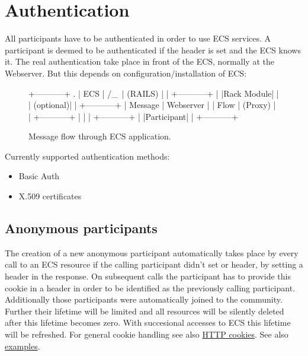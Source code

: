 \section{Authentication}%
%
All participants have to be authenticated in order to use ECS services. A
participant is deemed to be authenticated if the  header is set and
the ECS knows it. The real authentication take place in front of the ECS,
normally at the Webserver. But this depends on configuration/installation of
ECS:
\begin{figure}[p]
\noindent \begin{centering}
\begin{txtg}
   +-----------+    .        
   |   ECS     |   /_\       
   | (RAILS)   |    |        
   +-----------+    |        
   |Rack Module|    |        
   | (optional)|    |        
   +-----------+    | Message
   | Webserver |    | Flow   
   |  (Proxy)  |    |        
   +-----------+    |        
         |          |        
   +-----------+    |        
   |Participant|    |        
   +-----------+             

\end{txtg}
\par\end{centering}
\label{fig:ecs_message_flow}
\caption[ECS Message flow]{Message flow through ECS application.}
\end{figure}
Currently supported authentication methods:
\begin{itemize}
  \item Basic Auth
  \item X.509 certificates
\end{itemize}

\hypertarget{anonymous-participants}{}
\subsection{Anonymous participants}%
%
The creation of a new anonymous participant automatically takes place by every
call to an ECS resource if the calling participant didn't set \hv{X-EcsAuthId}
or  header, by setting a \hv{Set-Cookie} header in the response. On
subsequent calls the participant has to provide this cookie in a \hv{Cookie}
header in order to be identified as the previously calling participant.
Additionally those participants were automatically joined to the 
community. Further their lifetime will be limited and all resources will be
silently deleted after this lifetime becomes zero. With succesional accesses to
ECS this lifetime will be refreshed. For general cookie handling see also
\href{http://en.wikipedia.org/wiki/HTTP\_cookie}{HTTP cookies}. See also
\href{https://ecs.uni-stuttgart.de/ecsa-wiki/HeikoBernloehr/FreeLancer/ECS/ecs2/core/examples}{examples}. 



